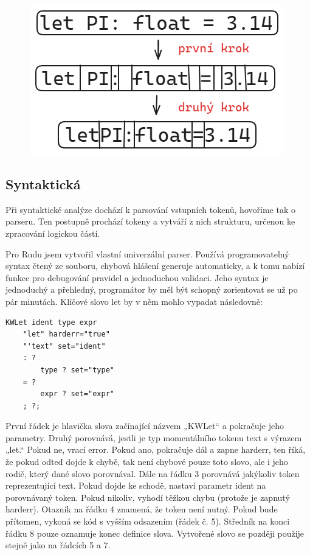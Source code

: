 \documentclass[12pt, a4paper,
twoside,        %
openright
]{report}
\begin{document}
\begin{figure}[h]
	\centering
	\includegraphics[width=0.5\linewidth]{image/lexer.png}
\end{figure}

\subsection{Syntaktická}

Při syntaktické analýze dochází k parsování vstupních tokenů, hovoříme tak o parseru. Ten postupně prochází tokeny a vytváří z nich strukturu, určenou ke zpracování logickou částí.

Pro Rudu jsem vytvořil vlastní univerzální parser. Používá programovatelný syntax čtený ze souboru, chybová hlášení generuje automaticky, a k tomu nabízí funkce pro debugování pravidel a jednoduchou validaci. Jeho syntax je jednoduchý a přehledný, programátor by měl být schopný zorientovat se už po pár minutách. Klíčové slovo let by v něm mohlo vypadat následovně:

\begin{lstlisting}[caption={Ukázka klíčového slova let}]
KWLet ident type expr
	"let" harderr="true"
	"'text" set="ident"
	: ?
		type ? set="type"
	= ?
		expr ? set="expr"
	; ?;
\end{lstlisting}

První řádek je hlavička slova začínající názvem „KWLet“ a pokračuje jeho parametry. Druhý porovnává, jestli je typ momentálního tokenu text s výrazem „let.“ Pokud ne, vrací error. Pokud ano, pokračuje dál a zapne harderr, ten říká, že pokud odteď dojde k chybě, tak není chybové pouze toto slovo, ale i jeho rodič, který dané slovo porovnával. Dále na řádku 3 porovnává jakýkoliv token reprezentující text. Pokud dojde ke schodě, nastaví parametr ident na porovnávaný token. Pokud nikoliv, vyhodí těžkou chybu (protože je zapnutý harderr). Otazník na řádku 4 znamená, že token není nutný. Pokud bude přítomen, vykoná se kód s vyšším odsazením (řádek č. 5). Středník na konci řádku 8 pouze oznamuje konec definice slova. Vytvořené slovo se později použije stejně jako na řádcích 5 a 7.
\end{document}
